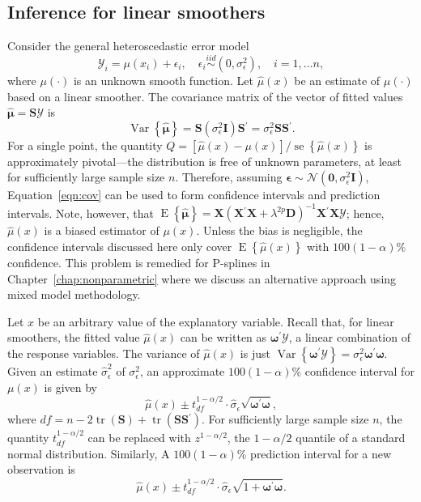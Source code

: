 \documentclass[cmfont,usenames,dvipsnames,leqno]{afit-etd}\usepackage[]{graphicx}\usepackage[]{color}
\newcommand{\trans}{\ensuremath{^\prime}}
\newcommand{\bc}[1]{\ensuremath{\bm{\mathcal{#1}}}}
\newcommand{\mc}[1]{\ensuremath{\mathcal{#1}}}
\newcommand{\wh}[1]{\ensuremath{\widehat{#1}}}
\newcommand{\E}{\operatorname{E}}
\newcommand{\var}{\operatorname{Var}}
\newcommand{\se}{\operatorname{se}}
\newcommand{\tr}{\operatorname{tr}}
\newcommand{\X}{\ensuremath{\bm{X}}}
\begin{document}
\subsection{Inference for linear smoothers}
\label{sec:pspline-inference}
Consider the general heteroscedastic error model
\begin{equation*}
  \mc{Y}_i = \mu(x_i) + \epsilon_i, \quad \epsilon_i \stackrel{iid}{\sim} (0, \sigma_\epsilon^2), \quad i = 1, \dotsc n,
\end{equation*}
where $\mu(\cdot)$ is an unknown smooth function. Let $\wh{\mu}(x)$ be an estimate of $\mu(\cdot)$ based on a linear smoother. The covariance matrix of the vector of fitted values $\wh{\bm{\mu}} = \bm{S}\bc{Y}$ is 
\begin{equation}
\label{eqn:cov}
  \var\left\{\wh{\bm{\mu}}\right\} = \bm{S}\left( \sigma_\epsilon^2\bm{I} \right) \bm{S}\trans = \sigma_\epsilon^2   \bm{S}\bm{S}\trans.
\end{equation}
For a single point, the quantity $Q = \left[ \wh{\mu}(x) - \mu(x) \right]/\se\left\{ \wh{\mu}(x) \right\}$ is approximately pivotal---the distribution is free of unknown parameters, at least for sufficiently large sample size $n$. Therefore, assuming $\bm{\epsilon} \sim \mc{N}(\bm{0}, \sigma_\epsilon^2\bm{I})$, Equation~\eqref{eqn:cov} can be used to form confidence intervals and prediction intervals. Note, however, that $\E\left\{\wh{\bm{\mu}}\right\} = \X\left( \X\trans\X + \lambda^{2p}\bm{D} \right)^{-1}\X\trans\X\bc{Y}$; hence, $\wh{\mu}(x)$ is a biased estimator of $\mu(x)$. Unless the bias is negligible, the confidence intervals discussed here only cover $\E\left\{\wh{\mu}(x)\right\}$ with $100(1 - \alpha)\%$ confidence. This problem is remedied for \ac{P-spline}s in Chapter~\ref{chap:nonparametric} where we discuss an alternative approach using mixed model methodology.  

Let $x$ be an arbitrary value of the explanatory variable. Recall that, for linear smoothers, the fitted value $\wh{\mu}(x)$ can be written as $\bm{\omega}\trans\bc{Y}$, a linear combination of the response variables. The variance of $\wh{\mu}(x)$ is just $\var\left\{\bm{\omega}\trans\bc{Y}\right\} = \sigma_\epsilon^2\bm{\omega}\trans\bm{\omega}$. Given an estimate $\wh{\sigma}_\epsilon^2$ of $\sigma_\epsilon^2$, an approximate $100(1 - \alpha)\%$ confidence interval for $\mu(x)$ is given by 
\begin{equation*}
  \wh{\mu}(x) \pm t_{df}^{1 - \alpha/2} \cdot \wh{\sigma}_\epsilon \sqrt{\bm{\omega}\trans\bm{\omega}},
\end{equation*}
where $df = n - 2\tr\left( \bm{S} \right) + \tr\left( \bm{S}\bm{S}\trans \right)$. For sufficiently large sample size $n$, the quantity $t_{df}^{1 - \alpha/2}$ can be replaced with $z^{1 - \alpha/2}$, the $1 - \alpha/2$ quantile of a standard normal distribution. Similarly, A $100(1 - \alpha)\%$ prediction interval for a new observation is 
\begin{equation*}
  \wh{\mu}(x) \pm t_{df}^{1 - \alpha/2} \cdot \wh{\sigma}_\epsilon \sqrt{1 + \bm{\omega}\trans\bm{\omega}}.
\end{equation*}
\end{document}
